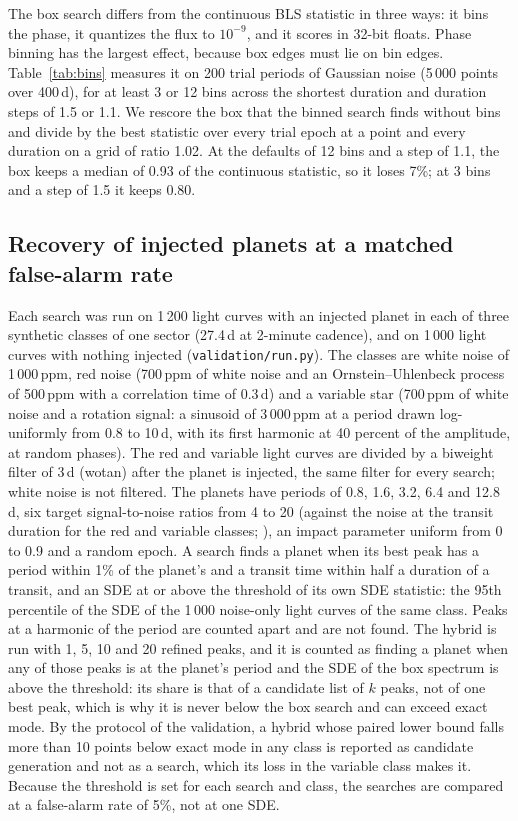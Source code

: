 \documentclass{aastex631}
\begin{document}
The box search differs from the continuous BLS statistic in three ways: it bins the phase, it quantizes the flux to $10^{-9}$, and it scores in 32-bit floats. Phase binning has the largest effect, because box edges must lie on bin edges. Table~\ref{tab:bins} measures it on 200 trial periods of Gaussian noise (5\,000 points over 400\,d), for at least 3 or 12 bins across the shortest duration and duration steps of 1.5 or 1.1. We rescore the box that the binned search finds without bins and divide by the best statistic over every trial epoch at a point and every duration on a grid of ratio 1.02. At the defaults of 12 bins and a step of 1.1, the box keeps a median of 0.93 of the continuous statistic, so it loses 7\%; at 3 bins and a step of 1.5 it keeps 0.80.


\subsection{Recovery of injected planets at a matched false-alarm rate}\label{sec:recovery}
Each search was run on 1\,200 light curves with an injected planet in each of three synthetic classes of one sector (27.4\,d at 2-minute cadence), and on 1\,000 light curves with nothing injected (\texttt{validation/run.py}). The classes are white noise of 1\,000\,ppm, red noise (700\,ppm of white noise and an Ornstein--Uhlenbeck process of 500\,ppm with a correlation time of 0.3\,d) and a variable star (700\,ppm of white noise and a rotation signal: a sinusoid of 3\,000\,ppm at a period drawn log-uniformly from 0.8 to 10\,d, with its first harmonic at 40 percent of the amplitude, at random phases). The red and variable light curves are divided by a biweight filter of 3\,d (wotan) after the planet is injected, the same filter for every search; white noise is not filtered. The planets have periods of 0.8, 1.6, 3.2, 6.4 and 12.8\,d, six target signal-to-noise ratios from 4 to 20 (against the noise at the transit duration for the red and variable classes; \citealt{Pont2006}), an impact parameter uniform from 0 to 0.9 and a random epoch. A search finds a planet when its best peak has a period within 1\% of the planet's and a transit time within half a duration of a transit, and an SDE at or above the threshold of its own SDE statistic: the 95th percentile of the SDE of the 1\,000 noise-only light curves of the same class. Peaks at a harmonic of the period are counted apart and are not found. The hybrid is run with 1, 5, 10 and 20 refined peaks, and it is counted as finding a planet when any of those peaks is at the planet's period and the SDE of the box spectrum is above the threshold: its share is that of a candidate list of $k$ peaks, not of one best peak, which is why it is never below the box search and can exceed exact mode. By the protocol of the validation, a hybrid whose paired lower bound falls more than 10 points below exact mode in any class is reported as candidate generation and not as a search, which its loss in the variable class makes it. Because the threshold is set for each search and class, the searches are compared at a false-alarm rate of 5\%, not at one SDE.
\end{document}
